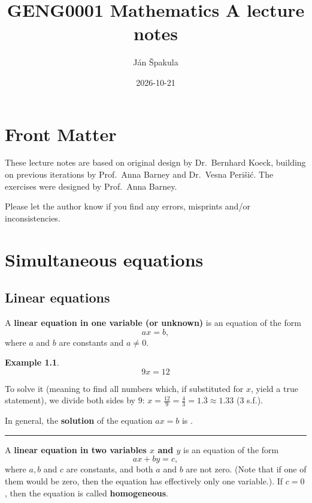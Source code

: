 \documentclass[
  english,
  12pt,
  oneside]{book}
\title{GENG0001 Mathematics A lecture notes}
\author{Ján Špakula}
\date{2026-10-21}
\theoremstyle{definition}
\theoremstyle{definition}
\newtheorem{example}{Example}[chapter]
\theoremstyle{definition}
\theoremstyle{definition}
\theoremstyle{remark}
\begin{document}
\maketitle

{
\setcounter{tocdepth}{1}
\tableofcontents
}
\chapter*{Front Matter}\label{front-matter}

These lecture notes are based on original design by Dr.~Bernhard Koeck, building on previous iterations by Prof.~Anna Barney and Dr.~Vesna Perišić. The exercises were designed by Prof.~Anna Barney.

Please let the author know if you find any errors, misprints and/or inconsistencies.

\chapter{Simultaneous equations}\label{simeq}

\section{Linear equations}\label{linear-equations}

A \textbf{linear equation in one variable (or unknown)} is an equation of the form
\[ax=b,\]
where \(a\) and \(b\) are constants and \(a\neq 0\).

\begin{example}
\protect\hypertarget{exm:unnamed-chunk-3}{}\label{exm:unnamed-chunk-3}\[9x=12\]
\end{example}

To solve it (meaning to find all numbers which, if substituted for \(x\), yield a true statement), we divide both sides by \(9\): \(x = \frac{12}{9} = \frac{4}{3} = 1.\overline{3} \approx 1.33\) (3 s.f.).

In general, the \textbf{solution} of the equation \(ax=b\) is .

\begin{center}\rule{0.5\linewidth}{0.5pt}\end{center}

A \textbf{linear equation in two variables \(x\) and \(y\)} is an equation of the form
\[ax+by=c,\]
where \(a,b\) and \(c\) are constants, and both \(a\) and \(b\) are not zero. (Note that if one of them would be zero, then the equation has effectively only one variable.). If \(c=0\), then the equation is called \textbf{homogeneous}.
\end{document}
